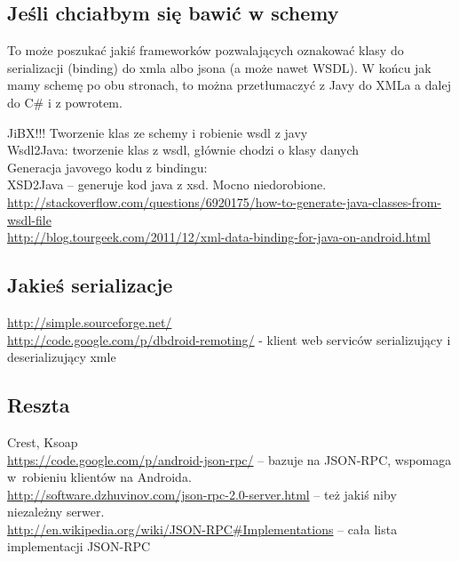 \subsection{Jeśli chciałbym się bawić w schemy}
To może poszukać jakiś frameworków pozwalających oznakować klasy do serializacji (binding) do xmla albo jsona (a może nawet WSDL).
W końcu jak mamy schemę po obu stronach, to można przetłumaczyć z Javy do XMLa a dalej do C\# i z powrotem.

JiBX!!! Tworzenie klas ze schemy i robienie wsdl z javy\\
Wsdl2Java: tworzenie klas z wsdl, głównie chodzi o klasy danych\\

Generacja javovego kodu z bindingu:\\
XSD2Java – generuje kod java z xsd. Mocno niedorobione.\\

\url{http://stackoverflow.com/questions/6920175/how-to-generate-java-classes-from-wsdl-file}\\
\url{http://blog.tourgeek.com/2011/12/xml-data-binding-for-java-on-android.html}\\

\subsection{Jakieś serializacje}
\url{http://simple.sourceforge.net/}\\
\url{http://code.google.com/p/dbdroid-remoting/} - klient web serviców serializujący i deserializujący xmle\\

\subsection{Reszta}
Crest, Ksoap \\
\url{https://code.google.com/p/android-json-rpc/} -- bazuje na JSON-RPC, wspomaga w~robieniu klientów na Androida.\\
\url{http://software.dzhuvinov.com/json-rpc-2.0-server.html} -- też jakiś niby niezależny serwer. \\ 
\url{http://en.wikipedia.org/wiki/JSON-RPC#Implementations} -- cała lista implementacji JSON-RPC


